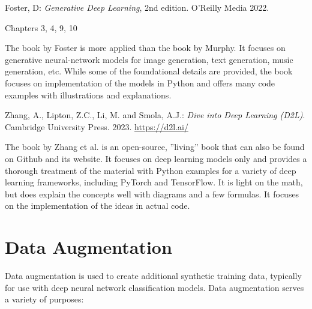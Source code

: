 \begin{resourcebox}
Foster, D: \emph{Generative Deep Learning}, 2nd edition. O'Reilly Media 2022. \\

\vspace{0.5\baselineskip}

Chapters 3, 4, 9, 10
\end{resourcebox}

The book by Foster is more applied than the book by Murphy. It focuses on generative neural-network models for image generation, text generation, music generation, etc. While some of the foundational details are provided, the book focuses on implementation of the models in Python and offers many code examples with illustrations and explanations.

\begin{resourcebox}
Zhang, A., Lipton, Z.C., Li, M. and Smola, A.J.: \emph{Dive into Deep Learning (D2L)}. Cambridge University Press. 2023. \url{https://d2l.ai/} \\
\end{resourcebox}

The book by Zhang et al. is an open-source, ''living'' book that can also be found on Github and its website. It focuses on deep learning models only and provides a thorough treatment of the material with Python examples for a variety of deep learning frameworks, including PyTorch and TensorFlow. It is light on the math, but does explain the concepts well with diagrams and a few formulas. It focuses on the implementation of the ideas in actual code. 


\section{Data Augmentation}

Data augmentation is used to create additional synthetic training data, typically for use with deep neural network classification models. Data augmentation serves a variety of purposes:


